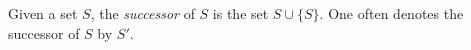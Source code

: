 \documentclass[12pt]{article}
\begin{document}
Given a set $S$, the {\em successor} of $S$ is the set $S \cup \{S\}$. One often denotes the successor of $S$ by $S'$.
\end{document}
